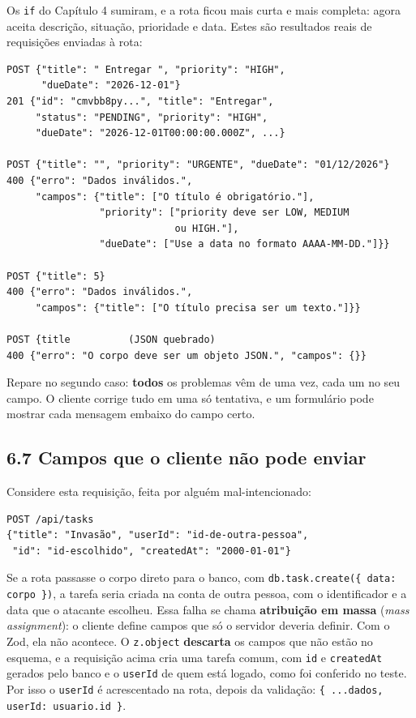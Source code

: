 Os \texttt{if} do Capítulo 4 sumiram, e a rota ficou mais curta e mais completa: agora aceita descrição, situação, prioridade e data. Estes são resultados reais de requisições enviadas à rota:

\begin{codigo}
\begin{Verbatim}[breaklines=true, breaksymbolleft={}, fontsize=\footnotesize]
POST {"title": " Entregar ", "priority": "HIGH",
      "dueDate": "2026-12-01"}
201 {"id": "cmvbb8py...", "title": "Entregar",
     "status": "PENDING", "priority": "HIGH",
     "dueDate": "2026-12-01T00:00:00.000Z", ...}

POST {"title": "", "priority": "URGENTE", "dueDate": "01/12/2026"}
400 {"erro": "Dados inválidos.",
     "campos": {"title": ["O título é obrigatório."],
                "priority": ["priority deve ser LOW, MEDIUM
                             ou HIGH."],
                "dueDate": ["Use a data no formato AAAA-MM-DD."]}}

POST {"title": 5}
400 {"erro": "Dados inválidos.",
     "campos": {"title": ["O título precisa ser um texto."]}}

POST {title          (JSON quebrado)
400 {"erro": "O corpo deve ser um objeto JSON.", "campos": {}}
\end{Verbatim}
\end{codigo}

Repare no segundo caso: \textbf{todos} os problemas vêm de uma vez, cada um no seu campo. O cliente corrige tudo em uma só tentativa, e um formulário pode mostrar cada mensagem embaixo do campo certo.

\subsection{6.7 Campos que o cliente não pode enviar}

Considere esta requisição, feita por alguém mal-intencionado:

\begin{codigo}
\begin{Verbatim}[breaklines=true, breaksymbolleft={}, fontsize=\footnotesize]
POST /api/tasks
{"title": "Invasão", "userId": "id-de-outra-pessoa",
 "id": "id-escolhido", "createdAt": "2000-01-01"}
\end{Verbatim}
\end{codigo}

Se a rota passasse o corpo direto para o banco, com \texttt{db.task.create(\{ data: corpo \})}, a tarefa seria criada na conta de outra pessoa, com o identificador e a data que o atacante escolheu. Essa falha se chama \textbf{atribuição em massa} (\textit{mass assignment}): o cliente define campos que só o servidor deveria definir. Com o Zod, ela não acontece. O \texttt{z.object} \textbf{descarta} os campos que não estão no esquema, e a requisição acima cria uma tarefa comum, com \texttt{id} e \texttt{createdAt} gerados pelo banco e o \texttt{userId} de quem está logado, como foi conferido no teste. Por isso o \texttt{userId} é acrescentado na rota, depois da validação: \texttt{\{ ...dados, userId: usuario.id \}}.

